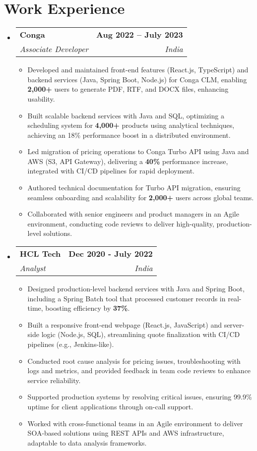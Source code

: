 \documentclass[letterpaper,11pt]{article}
\makeatletter
\newcommand{\resumeItem}[1]{
  \item\small{
    {#1 \vspace{0pt}}
  }
}
\newcommand{\resumeSubheading}[4]{
  \vspace{-2pt}\item
    \begin{tabular*}{1.0\textwidth}[t]{l@{\extracolsep{\fill}}r}
      \textbf{#1} & \textbf{\small #2} \\
      \textit{\small #3} & \textit{\small #4} \\
    \end{tabular*}\vspace{-7pt}
}
\newcommand{\resumeSubHeadingListStart}{\begin{itemize}[leftmargin=0.0in, label={}]}
\newcommand{\resumeSubHeadingListEnd}{\end{itemize}\vspace{0pt}}
\newcommand{\resumeItemListStart}{\begin{itemize}}
\newcommand{\resumeItemListEnd}{\end{itemize}\vspace{-5pt}}
\makeatother
\begin{document}
\section{Work Experience}
\resumeSubHeadingListStart
  \resumeSubheading{Conga}{Aug 2022 – July 2023}{Associate Developer}{India} 
  \resumeItemListStart
    \resumeItem{Developed and maintained front-end features (React.js, TypeScript) and backend services (Java, Spring Boot, Node.js) for Conga CLM, enabling \textbf{2,000+} users to generate PDF, RTF, and DOCX files, enhancing usability.}
    \resumeItem{Built scalable backend services with Java and SQL, optimizing a scheduling system for \textbf{4,000+} products using analytical techniques, achieving an 18\% performance boost in a distributed environment.}
    \resumeItem{Led migration of pricing operations to Conga Turbo API using Java and AWS (S3, API Gateway), delivering a \textbf{40\%} performance increase, integrated with CI/CD pipelines for rapid deployment.}
    \resumeItem{Authored technical documentation for Turbo API migration, ensuring seamless onboarding and scalability for \textbf{2,000+} users across global teams.}
    \resumeItem{Collaborated with senior engineers and product managers in an Agile environment, conducting code reviews to deliver high-quality, production-level solutions.}
  \resumeItemListEnd

  \vspace{-7pt}
  \resumeSubheading{HCL Tech}{Dec 2020 - July 2022}{Analyst}{India} 
  \resumeItemListStart
    \resumeItem{Designed production-level backend services with Java and Spring Boot, including a Spring Batch tool that processed customer records in real-time, boosting efficiency by \textbf{37\%}.}
    \resumeItem{Built a responsive front-end webpage (React.js, JavaScript) and server-side logic (Node.js, SQL), streamlining quote finalization with CI/CD pipelines (e.g., Jenkins-like).}
    \resumeItem{Conducted root cause analysis for pricing issues, troubleshooting with logs and metrics, and provided feedback in team code reviews to enhance service reliability.}
    \resumeItem{Supported production systems by resolving critical issues, ensuring 99.9\% uptime for client applications through on-call support.}
    \resumeItem{Worked with cross-functional teams in an Agile environment to deliver SOA-based solutions using REST APIs and AWS infrastructure, adaptable to data analysis frameworks.}
  \resumeItemListEnd
\vspace{-12pt}
\resumeSubHeadingListEnd

\end{document}
